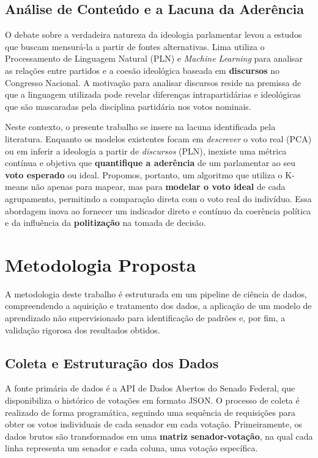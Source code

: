 \documentclass[conference]{IEEEtran}
\begin{document}
\subsection{Análise de Conteúdo e a Lacuna da Aderência}
O debate sobre a verdadeira natureza da ideologia parlamentar levou a estudos que buscam mensurá-la a partir de fontes alternativas. Lima \cite{lima2023} utiliza o Processamento de Linguagem Natural (PLN) e \textit{Machine Learning} para analisar as relações entre partidos e a coesão ideológica baseada em \textbf{discursos} no Congresso Nacional. A motivação para analisar discursos reside na premissa de que a linguagem utilizada pode revelar diferenças intrapartidárias e ideológicas que são mascaradas pela disciplina partidária nos votos nominais.

Neste contexto, o presente trabalho se insere na lacuna identificada pela literatura. Enquanto os modelos existentes focam em \textit{descrever} o voto real (PCA) ou em inferir a ideologia a partir de \textit{discursos} (PLN), inexiste uma métrica contínua e objetiva que \textbf{quantifique a aderência} de um parlamentar ao seu \textbf{voto esperado} ou ideal. Propomos, portanto, um algoritmo que utiliza o K-means não apenas para mapear, mas para \textbf{modelar o voto ideal} de cada agrupamento, permitindo a comparação direta com o voto real do indivíduo. Essa abordagem inova ao fornecer um indicador direto e contínuo da coerência política e da influência da \textbf{politização} na tomada de decisão.

\section{Metodologia Proposta}
\label{sec:metodologia}
A metodologia deste trabalho é estruturada em um pipeline de ciência de dados, compreendendo a aquisição e tratamento dos dados, a aplicação de um modelo de aprendizado não supervisionado para identificação de padrões e, por fim, a validação rigorosa dos resultados obtidos.

\subsection{Coleta e Estruturação dos Dados}
A fonte primária de dados é a API de Dados Abertos do Senado Federal, que disponibiliza o histórico de votações em formato JSON. O processo de coleta é realizado de forma programática, seguindo uma sequência de requisições para obter os votos individuais de cada senador em cada votação. Primeiramente, os dados brutos são transformados em uma \textbf{matriz senador-votação}, na qual cada linha representa um senador e cada coluna, uma votação específica.
\end{document}
